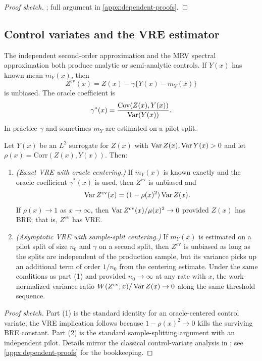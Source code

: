 \begin{proof}[Proof sketch]
; full argument in \cref{appx:dependent-proofs}.
\end{proof}

\subsection{Control variates and the VRE estimator}

The independent second-order approximation and the MRV spectral approximation
both produce analytic or semi-analytic controls. If \(Y(x)\) has known mean
\(m_Y(x)\), then
\[
  Z^{\mathrm{cv}}(x)=Z(x)-\gamma\{Y(x)-m_Y(x)\}
\]
is unbiased. The oracle coefficient is
\[
  \gamma^*(x)=\frac{\operatorname{Cov}(Z(x),Y(x))}{\operatorname{Var}(Y(x))}.
\]
In practice \(\gamma\) and sometimes \(m_Y\) are estimated on a pilot split.

\begin{proposition}
\label{prop:vre}
Let \(Y(x)\) be an $L^2$ surrogate for \(Z(x)\) with $\operatorname{Var} Z(x),\operatorname{Var} Y(x)>0$
and let
\(\rho(x)=\mathrm{Corr}(Z(x),Y(x))\). Then:
\begin{enumerate}
\item \emph{(Exact VRE with oracle centering.)} If \(m_Y(x)\) is known exactly
and the oracle coefficient \(\gamma^*(x)\) is used, then $Z^{\mathrm{cv}}$ is
unbiased and
\[
  \operatorname{Var} Z^{\mathrm{cv}}(x)=(1-\rho(x)^2)\operatorname{Var} Z(x).
\]
If $\rho(x)\to 1$ as $x\to\infty$, then $\operatorname{Var} Z^{\mathrm{cv}}(x)/\mu(x)^2\to 0$
provided $Z(x)$ has BRE; that is, $Z^{\mathrm{cv}}$ has VRE.
\item \emph{(Asymptotic VRE with sample-split centering.)} If \(m_Y(x)\) is
estimated on a pilot split of size $n_0$ and \(\gamma\) on a second split, then
$Z^{\mathrm{cv}}$ is unbiased as long as the splits are independent of the
production sample, but its variance picks up an additional term of order
$1/n_0$ from the centering estimate. Under the same conditions as part (1)
and provided $n_0\to\infty$ at any rate with $x$, the work-normalized variance
ratio $W(Z^{\mathrm{cv}};x)/\operatorname{Var} Z(x)\to 0$ along the same threshold sequence.
\end{enumerate}
\end{proposition}

\begin{proof}[Proof sketch]
Part (1) is the standard identity for an oracle-centered control variate; the
VRE implication follows because $1-\rho(x)^2\to 0$ kills the surviving BRE
constant. Part (2) is the standard sample-splitting argument with an
independent pilot. Details mirror the classical control-variate analysis in
\citet{Glasserman2004}; see \cref{appx:dependent-proofs} for the bookkeeping.
\end{proof}

